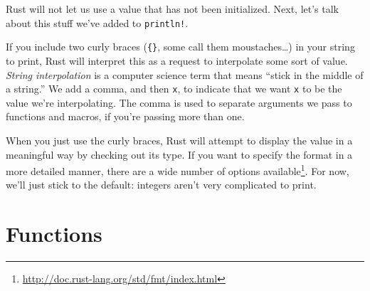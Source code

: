\documentclass[a4paper,]{book}
\newenvironment{Shaded}{\begin{snugshade}}{\end{snugshade}}
\newcommand{\KeywordTok}[1]{\textcolor[rgb]{0.13,0.29,0.53}{\textbf{{#1}}}}
\newcommand{\StringTok}[1]{\textcolor[rgb]{0.31,0.60,0.02}{{#1}}}
\newcommand{\NormalTok}[1]{{#1}}
\renewcommand{\href}[2]{#2\footnote{\url{#1}}}
\begin{document}
\begin{Shaded}
\end{Shaded}

Rust will not let us use a value that has not been initialized. Next,
let's talk about this stuff we've added to \texttt{println!}.

If you include two curly braces (\texttt{\{\}}, some call them
moustaches\ldots{}) in your string to print, Rust will interpret this as
a request to interpolate some sort of value. \emph{String interpolation}
is a computer science term that means ``stick in the middle of a
string.'' We add a comma, and then \texttt{x}, to indicate that we want
\texttt{x} to be the value we're interpolating. The comma is used to
separate arguments we pass to functions and macros, if you're passing
more than one.

When you just use the curly braces, Rust will attempt to display the
value in a meaningful way by checking out its type. If you want to
specify the format in a more detailed manner, there are a
\href{http://doc.rust-lang.org/std/fmt/index.html}{wide number of
options available}. For now, we'll just stick to the default: integers
aren't very complicated to print.

\section{Functions}\label{sec--functions}
\end{document}
